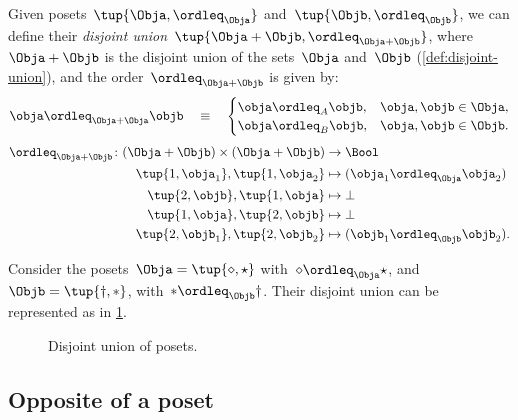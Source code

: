 \begin{definition}
    Given posets~$\tup{\Obja, \ordleq_\Obja}$ and~$\tup{\Objb, \ordleq_\Objb}$, we can define their \emph{disjoint union}~$\tup{\Obja + \Objb, \ordleq_{\Obja + \Objb}}$, where~$\Obja + \Objb$
    is the disjoint union of the sets~$\Obja$ and~$\Objb$ (\cref{def:disjoint-union}), and the
    order~$\ordleq_{\Obja + \Objb}$ is given by:
    \begin{equation}
        \obja \ordleq_{\Obja + \Obja} \objb \quad\equiv\quad
        \begin{cases}
            \obja \ordleq_A \objb, & \obja,\objb \in \Obja, \\
            \obja \ordleq_B \objb, & \obja,\objb \in \Objb.
        \end{cases}
    \end{equation}
    \begin{equation}
        \begin{aligned}
            \ordleq_{\Obja+\Objb}\colon (\Obja+\Objb)\times (\Obja+\Objb)&\to \Bool\\
            \tup{1,\obja_1},\tup{1,\obja_2}&\mapsto (\obja_1\ordleq_{\Obja} \obja_2)\\
            \tup{2,\objb},\tup{1,\obja}&\mapsto \bot\\
            \tup{1,\obja},\tup{2,\objb}&\mapsto \bot\\
            \tup{2,\objb_1},\tup{2,\objb_2}&\mapsto (\objb_1\ordleq_\Objb \objb_2).
        \end{aligned}
    \end{equation}
\end{definition}


\begin{example}
    Consider the posets~$\Obja=\tup{\diamond, \star}$ with~$\diamond \ordleq_\Obja \star$, and~$\Objb=\tup{\dagger,\ast}$, with~$\ast \ordleq_\Objb \dagger$. Their disjoint union can be represented as in \cref{fig:poset-coproduct}.

    \begin{figure}[h!]
        \centering
        \caption{Disjoint union of posets. \label{fig:poset-coproduct}}
    \end{figure}
\end{example}

\subsection{Opposite of a poset}\label{subsec:opposite-of-a-poset}

